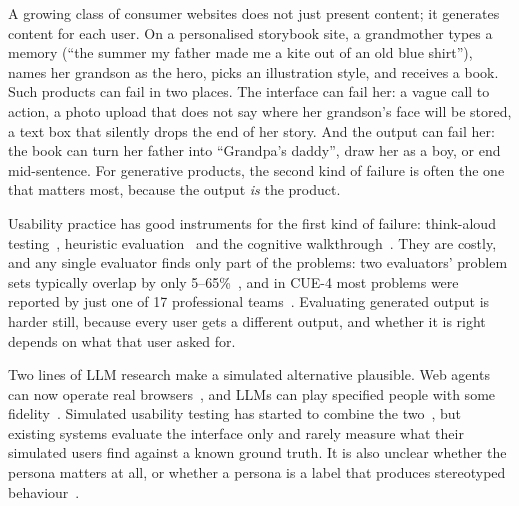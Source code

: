 \documentclass[10pt,twocolumn]{article}
\begin{document}
A growing class of consumer websites does not just present content; it generates content for each user. On a personalised storybook site, a grandmother types a memory (``the summer my father made me a kite out of an old blue shirt''), names her grandson as the hero, picks an illustration style, and receives a book. Such products can fail in two places. The interface can fail her: a vague call to action, a photo upload that does not say where her grandson's face will be stored, a text box that silently drops the end of her story. And the output can fail her: the book can turn her father into ``Grandpa's daddy'', draw her as a boy, or end mid-sentence. For generative products, the second kind of failure is often the one that matters most, because the output \emph{is} the product.

Usability practice has good instruments for the first kind of failure: think-aloud testing~\cite{ericsson1993protocol}, heuristic evaluation~\cite{nielsen1990heuristic,nielsen1994heuristic} and the cognitive walkthrough~\cite{polson1992cognitive,wharton1994cognitive}. They are costly, and any single evaluator finds only part of the problems: two evaluators' problem sets typically overlap by only 5--65\%~\cite{hertzum2001evaluator}, and in CUE-4 most problems were reported by just one of 17 professional teams~\cite{molich2008cue4}. Evaluating generated output is harder still, because every user gets a different output, and whether it is right depends on what that user asked for.

Two lines of LLM research make a simulated alternative plausible. Web agents can now operate real browsers~\cite{yao2023react,zhou2024webarena,deng2023mind2web,zheng2024seeact,he2024webvoyager,koh2024visualwebarena}, and LLMs can play specified people with some fidelity~\cite{park2023generative,argyle2023out,moon2024virtual,jiang2024personallm}. Simulated usability testing has started to combine the two~\cite{lu2025uxagent,xiang2024simuser}, but existing systems evaluate the interface only and rarely measure what their simulated users find against a known ground truth. It is also unclear whether the persona matters at all, or whether a persona is a label that produces stereotyped behaviour~\cite{cheng2023compost,wang2025large}.
\end{document}
